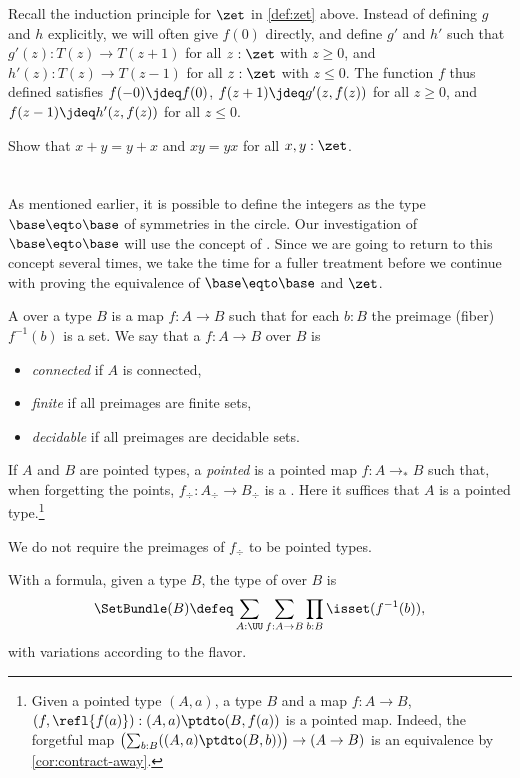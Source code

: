 Recall the induction principle for $\zet$ in \cref{def:zet} above.
Instead of defining $g$ and $h$ explicitly, we will often
give $f(0)$ directly, and
define $g'$ and $h'$ such that $g'(z): T(z)\to T(z+1)$
for all $z:\zet$ with $z\geq 0$, and $h'(z): T(z)\to T(z-1)$
for all $z:\zet$ with $z\leq 0$. The function $f$ thus defined
satisfies $f(-0) \jdeq f(0)$,
$f(z+1)\jdeq g'(z,f(z))$ for all $z\geq 0$,
and $f(z-1)\jdeq h'(z,f(z))$ for all $z\leq 0$.

\begin{xca}\label{xca:commutative-add-Z}
  Show that $x+y = y+x$ and $xy=yx$ for all $x,y:\zet$.
\end{xca}

\section{\Coverings}
\label{sec:covering}

As mentioned earlier, it is possible to define the integers as the
type $\base\eqto\base$ of symmetries in the circle.
Our investigation of $\base\eqto\base$ will use the concept of \coverings.
Since we are going to return to this concept several times,
we take the time for a fuller treatment before we continue with
proving the equivalence of $\base\eqto\base$ and $\zet$.

\begin{definition}\label{def:covering}
A \emph{\covering} over a type $B$
is a map $f:A\to B$ such that for each $b:B$ the preimage
(fiber) $f^{-1}(b)$ is a set.
We say that a \covering $f:A\to B$ over $B$ is
\begin{itemize}
\item \emph{connected} if $A$ is connected,
\item \emph{finite} if all preimages are finite sets,
\item \emph{decidable} if all preimages are decidable sets.
\end{itemize}

If $A$ and $B$ are pointed types, a \emph{pointed} \covering is a pointed map
$f:A\to_*B$ such that, when forgetting the points, $f_\div:A_\div\to B_\div$
is a \covering. Here it suffices that $A$ is a pointed type.\footnote{%
  Given a pointed type $(A,a)$, a type $B$ and a map $f : A \to B$,
  $(f,\refl{f(a)}) : (A,a) \ptdto (B,f(a))$ is a pointed map.
  Indeed, the forgetful map $\bigl(\sum_{b:B}((A,a)\ptdto(B,b))\bigr)
  \to (A \to B)$ is an equivalence by \cref{cor:contract-away}.}

We do not require the preimages of $f_\div$ to be pointed types.
\end{definition}
With a formula, given a type $B$, the type of \coverings over $B$ is
\[
\SetBundle(B) \defeq \sum_{A:\UU}\sum_{f:A\to B}\prod_{b:B}\isset(f^{-1}(b)),
\]
with variations according to the flavor.

